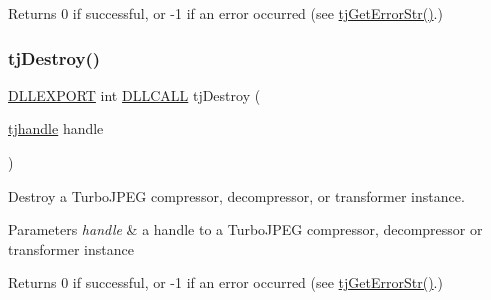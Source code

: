 \begin{DoxyReturn}{Returns}
0 if successful, or -\/1 if an error occurred (see \hyperlink{group___turbo_j_p_e_g_ga9af79c908ec131b1ae8d52fe40375abf}{tj\+Get\+Error\+Str()}.) 
\end{DoxyReturn}
\mbox{\label{group___turbo_j_p_e_g_ga674adee917b95ad4a896f1ba39e12540}} 
\subsubsection{\texorpdfstring{tj\+Destroy()}{tjDestroy()}}
{\footnotesize\ttfamily \hyperlink{turbojpeg_8h_a808e08638be3cba36e36759e5b150de0}{D\+L\+L\+E\+X\+P\+O\+RT} int \hyperlink{turbojpeg_8h_a54b25836118bfac94a53a7b790f3ccb2}{D\+L\+L\+C\+A\+LL} tj\+Destroy (\begin{DoxyParamCaption}\item[{\hyperlink{group___turbo_j_p_e_g_ga758d2634ecb4949de7815cba621f5763}{tjhandle}}]{handle }\end{DoxyParamCaption})}

Destroy a Turbo\+J\+P\+EG compressor, decompressor, or transformer instance.


\begin{DoxyParams}{Parameters}
{\em handle} & a handle to a Turbo\+J\+P\+EG compressor, decompressor or transformer instance\\
\hline
\end{DoxyParams}
\begin{DoxyReturn}{Returns}
0 if successful, or -\/1 if an error occurred (see \hyperlink{group___turbo_j_p_e_g_ga9af79c908ec131b1ae8d52fe40375abf}{tj\+Get\+Error\+Str()}.) 
\end{DoxyReturn}
\mbox{\label{group___turbo_j_p_e_g_ga7a1c4f05a7afdff37f5afec29367486b}} 
